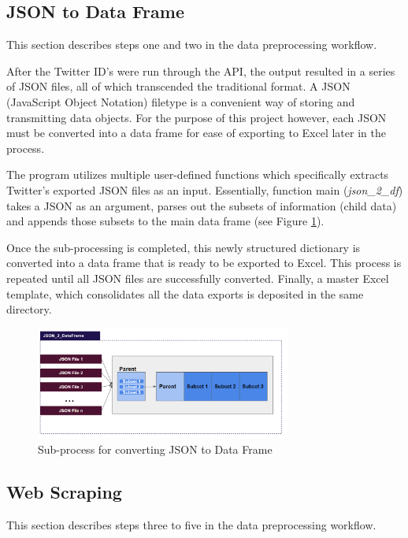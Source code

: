 \documentclass[12pt]{article}
\begin{document}
\subsection{JSON to Data Frame}

This section describes steps one and two in the data preprocessing workflow. 

After the Twitter ID’s were run through the API, the output resulted in a series of JSON files, all of which transcended the traditional format. A JSON (JavaScript Object Notation) filetype is a convenient way of storing and transmitting data objects.  For the purpose of this project however, each JSON must be converted into a data frame for ease of exporting to Excel later in the process. 

The program utilizes multiple user-defined functions which specifically extracts Twitter’s exported JSON files as an input.  Essentially, function main (\textit{json\_2\_df}) takes a JSON as an argument, parses out the subsets of information (child data) and appends those subsets to the main data frame (see Figure  \ref{fig:json2df}).

Once the sub-processing is completed, this newly structured dictionary is converted into a data frame that is ready to be exported to Excel. This process is repeated until all JSON files are successfully converted.  Finally, a master Excel template, which consolidates all the data exports is deposited in the same directory.


\begin{figure}[tbp]
\centering 
\includegraphics[width=0.75\textwidth]{figures/json2df}
\caption{Sub-process for converting JSON to Data Frame} 
\label{fig:json2df}
\end{figure}

\subsection{Web Scraping}

This section describes steps three to five in the data preprocessing workflow. 
\end{document}
